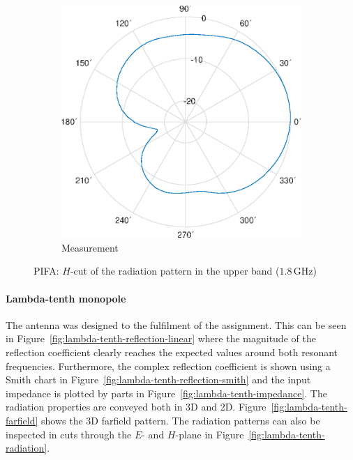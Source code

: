 \documentclass[11pt,a4paper]{article}
\begin{document}
\begin{figure}[!ht]
\begin{subfigure}{.4\textwidth}
                \includegraphics[width=\textwidth]{src/pifa-meas-radiation-h-1G8Hz.eps}
                \caption{\label{fig:pifa-meas-radiation-h-1G8Hz}Measurement}
            \end{subfigure}
            \caption{\label{fig:pifa-radiation-h-1G8Hz}PIFA: $H$-cut of the radiation pattern in the upper band ($1.8\, \mathrm{GHz}$)}
        \end{figure}

\newpage
        \paragraph{Lambda-tenth monopole} The antenna was designed to the fulfilment of the assignment. This can be seen in Figure~\ref{fig:lambda-tenth-reflection-linear} where the magnitude of the reflection coefficient clearly reaches the expected values around both resonant frequencies. Furthermore, the complex reflection coefficient is shown using a Smith chart in Figure~\ref{fig:lambda-tenth-reflection-smith} and the input impedance is plotted by parts in Figure~\ref{fig:lambda-tenth-impedance}. The radiation properties are conveyed both in 3D and 2D. Figure~\ref{fig:lambda-tenth-farfield} shows the 3D farfield pattern. The radiation patterns can also be inspected in cuts through the $E$- and $H$-plane in Figure~\ref{fig:lambda-tenth-radiation}.
        
\end{document}

